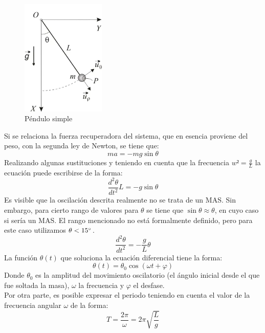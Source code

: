 \documentclass[spanish,notitlepage,letterpaper, 12pt]{article}
\begin{document}
\begin{figure}[h]
    \centering
    \includegraphics[width=4.0cm]{images/Pendulo-simple.png}
    \caption{Péndulo simple}
    \label{Figura 1}
\end{figure}
    
Si se relaciona la fuerza recuperadora del sistema, que en esencia proviene del peso, con la segunda ley de Newton, se tiene que: 
\begin{equation}
    ma=-mg\sin{\theta}
\end{equation}
Realizando algunas sustituciones y teniendo en cuenta que la frecuencia $w²=\frac{g}{L}$ la ecuación puede escribirse de la forma:
\begin{equation}
    \frac{d^2\theta}{dt^2}L=-g\sin{\theta}
\end{equation}
Es visible que la oscilación descrita realmente no se trata de un MAS. Sin embargo, para cierto rango de valores para $\theta$ se tiene que $\sin{\theta}\approx\theta$, en cuyo caso si sería un MAS. El rango mencionado no está formalmente definido, pero para este caso utilizamos $\theta<15\degree$.
\begin{equation}
    \frac{d^2\theta}{dt^2}=-\frac{g}{L}\theta
\end{equation}
La función $\theta(t)$ que soluciona la ecuación diferencial tiene la forma:
\begin{equation}
    \theta(t)=\theta_0\cos{(\omega t+\varphi)}
\end{equation}
Donde $\theta_0$ es la amplitud del movimiento oscilatorio (el ángulo inicial desde el que fue soltada la masa), $\omega$ la frecuencia y $\varphi$ el desfase. \cite{serway_jewett_2017}\\

Por otra parte, es posible expresar el periodo teniendo en cuenta el valor de la frecuencia angular $\omega$ de la forma:
\begin{equation}
    T=\frac{2\pi}{\omega}=2\pi\sqrt{\frac{L}{g}}
\end{equation}
\end{document}
